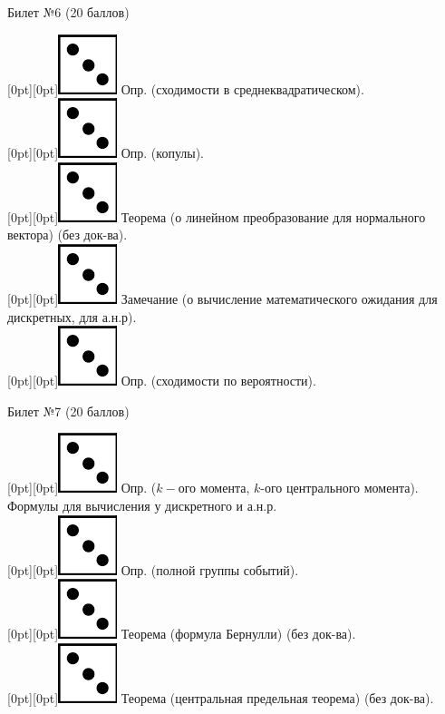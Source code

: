 \documentclass[10pt]{article}
\begin{document}
\begin{center} {\Large Билет №6 (20 баллов)} \end{center}
\raisebox{-1pt}[0pt][0pt]{\includegraphics[width=0.02\linewidth]{3.png}} Опр. (сходимости в среднеквадратическом). \\
\raisebox{-1pt}[0pt][0pt]{\includegraphics[width=0.02\linewidth]{3.png}} Опр. (копулы). \\
\raisebox{-1pt}[0pt][0pt]{\includegraphics[width=0.02\linewidth]{3.png}} Теорема (о линейном преобразование для нормального вектора) (без док-ва). \\
\raisebox{-1pt}[0pt][0pt]{\includegraphics[width=0.02\linewidth]{3.png}} Замечание (о вычисление  математического ожидания для дискретных, для а.н.р). \\
\raisebox{-1pt}[0pt][0pt]{\includegraphics[width=0.02\linewidth]{3.png}} Опр. (сходимости по вероятности). \\
\begin{center} {\Large Билет №7 (20 баллов)} \end{center}
\raisebox{-1pt}[0pt][0pt]{\includegraphics[width=0.02\linewidth]{3.png}} Опр. ($k-$ого момента, $k$-ого центрального момента). Формулы для вычисления у дискретного и а.н.р. \\
\raisebox{-1pt}[0pt][0pt]{\includegraphics[width=0.02\linewidth]{3.png}} Опр. (полной группы событий). \\
\raisebox{-1pt}[0pt][0pt]{\includegraphics[width=0.02\linewidth]{3.png}} Теорема (формула Бернулли) (без док-ва). \\
\raisebox{-1pt}[0pt][0pt]{\includegraphics[width=0.02\linewidth]{3.png}} Теорема (центральная предельная теорема) (без док-ва). \\
\end{document}

